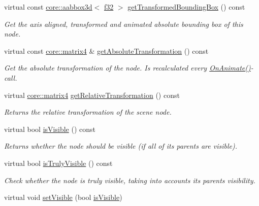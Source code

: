 \begin{DoxyCompactItemize}
virtual const \hyperlink{classirr_1_1core_1_1aabbox3d}{core\+::aabbox3d}$<$ \hyperlink{namespaceirr_a0277be98d67dc26ff93b1a6a1d086b07}{f32} $>$ \hyperlink{classirr_1_1scene_1_1ISceneNode_a77746edcc479107067fbf1f4471ab412}{get\+Transformed\+Bounding\+Box} () const
\begin{DoxyCompactList}\small\item\em Get the axis aligned, transformed and animated absolute bounding box of this node. \end{DoxyCompactList}\item 
virtual const \hyperlink{namespaceirr_1_1core_a4c9d4e29899535971052810954a14431}{core\+::matrix4} \& \hyperlink{classirr_1_1scene_1_1ISceneNode_af13dc546a7be796cc0868a2eec51e508}{get\+Absolute\+Transformation} () const
\begin{DoxyCompactList}\small\item\em Get the absolute transformation of the node. Is recalculated every \hyperlink{classirr_1_1scene_1_1ISceneNode_afc1dcb5cb19116d0c7aa3d4ebdf04cc5}{On\+Animate()}-\/call. \end{DoxyCompactList}\item 
virtual \hyperlink{namespaceirr_1_1core_a4c9d4e29899535971052810954a14431}{core\+::matrix4} \hyperlink{classirr_1_1scene_1_1ISceneNode_ac7c47ec49174315af83cf5f5d24edb24}{get\+Relative\+Transformation} () const
\begin{DoxyCompactList}\small\item\em Returns the relative transformation of the scene node. \end{DoxyCompactList}\item 
virtual bool \hyperlink{classirr_1_1scene_1_1ISceneNode_a9e8e4e8be0055e8182eb26b055abf339}{is\+Visible} () const
\begin{DoxyCompactList}\small\item\em Returns whether the node should be visible (if all of its parents are visible). \end{DoxyCompactList}\item 
virtual bool \hyperlink{classirr_1_1scene_1_1ISceneNode_a457fda8e5bca28a1c7af1691fefd4f75}{is\+Truly\+Visible} () const
\begin{DoxyCompactList}\small\item\em Check whether the node is truly visible, taking into accounts its parents\textquotesingle{} visibility. \end{DoxyCompactList}\item 
virtual void \hyperlink{classirr_1_1scene_1_1ISceneNode_a2e3a88fe87d11caa7986a203afe6838c}{set\+Visible} (bool \hyperlink{classirr_1_1scene_1_1ISceneNode_a9e8e4e8be0055e8182eb26b055abf339}{is\+Visible})

\end{DoxyCompactItemize}
